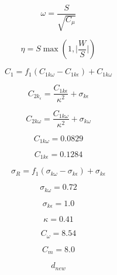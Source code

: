 \begin{equation}
\omega =\frac{S}{\sqrt{C_{\mu }}}
\end{equation}

\begin{equation}
\eta =S\max (1, \vert \frac{W}{S}\vert )
\end{equation}

\begin{equation}
C_{1}=f_{1}(C_{1k\omega }-C_{1k\epsilon })+C_{1k\omega }
\end{equation}

\begin{equation}
C_{2k_{\epsilon}}=\frac{C_{1k\epsilon }}{\kappa ^{2}}+ \sigma _{k\epsilon }
\end{equation}

\begin{equation}
C_{2k\omega }=\frac{C_{1k\omega }}{\kappa ^{2}}+ \sigma _{k\omega }
\end{equation}

\begin{equation}
C_{1k\omega }=0.0829
\end{equation}

\begin{equation}
C_{1k\epsilon }=0.1284
\end{equation}

\begin{equation}
\sigma _{R}= f_{1}(\sigma _{k\omega }- \sigma _{k\epsilon })+\sigma_{k\epsilon }
\end{equation}

\begin{equation}
\sigma _{k\omega }=0.72
\end{equation}

\begin{equation}
\sigma _{k\epsilon }=1.0
\end{equation}

\begin{equation}
\kappa =0.41
\end{equation}

\begin{equation}
C_{\omega }=8.54
\end{equation}

\begin{equation}
C_{m}=8.0
\end{equation}

\begin{equation}
d_{new}
\end{equation}

